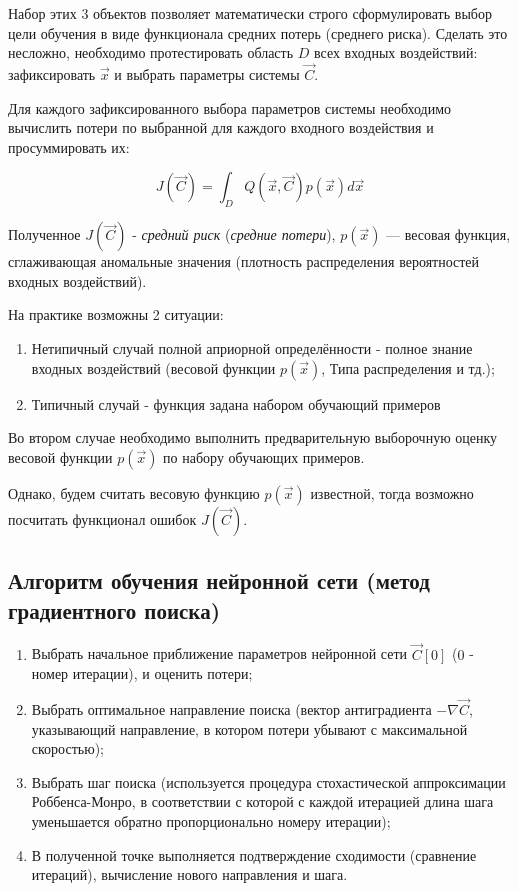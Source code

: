 \documentclass[a4paper]{article}
\numberwithin{equation}{subsection}
\begin{document}
Набор этих 3 объектов позволяет математически строго сформулировать выбор цели обучения 
в виде функционала средних потерь (среднего риска).
Сделать это несложно, необходимо протестировать область $D$ всех входных воздействий: 
зафиксировать $\vec{x}$ и выбрать параметры системы $\vec{C}$. 

Для каждого зафиксированного выбора параметров системы необходимо вычислить 
потери по выбранной для каждого входного воздействия и просуммировать их:

\begin{equation}
    J(\vec{C}) = \int_{D} Q(\vec{x}, \vec{C}) p(\vec{x}) d\vec{x}
    \label{eq:avg_risk}
\end{equation}

Полученное $J(\vec{C})$ - \textit{средний риск} (\textit{средние потери}), $p(\vec{x})$ --- 
весовая функция, сглаживающая аномальные значения (плотность распределения вероятностей 
входных воздействий).

На практике возможны 2 ситуации:
\begin{enumerate}
    \item Нетипичный случай полной априорной определённости - полное знание входных 
    воздействий (весовой функции $p(\vec{x})$, Типа распределения и тд.);
    \item Типичный случай - функция задана набором обучающий примеров
\end{enumerate}

Во втором случае необходимо выполнить предварительную выборочную оценку весовой функции 
$p(\vec{x})$ по набору обучающих примеров.

Однако, будем считать весовую функцию $p(\vec{x})$ известной, тогда возможно посчитать функционал 
ошибок $J(\vec{C})$.

\subsection{Алгоритм обучения нейронной сети (метод градиентного поиска)}
\begin{enumerate}
    \item Выбрать начальное приближение параметров нейронной сети $\vec{C}[0]$ 
    ($0$ - номер итерации), и оценить потери;
    \item Выбрать оптимальное направление поиска (вектор антиградиента 
    $-\nabla\vec{C}$, указывающий направление, в котором потери убывают 
    с максимальной скоростью);
    \item Выбрать шаг поиска (используется процедура стохастической 
    аппроксимации Роббенса-Монро, в соответствии с которой с каждой 
    итерацией длина шага уменьшается обратно пропорционально номеру итерации);
    \item[] В полученной точке выполняется подтверждение сходимости 
    (сравнение итераций), вычисление нового направления и шага.
    \label{en:alg}
\end{enumerate}
\end{document}
